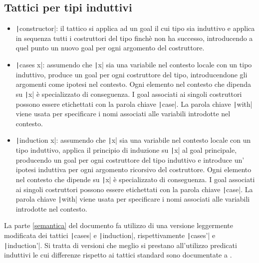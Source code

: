 \begin{itemize}
\end{itemize}

\subsection{Tattici per tipi induttivi}
\begin{itemize}
    \item \texttt|constructor|: il tattico si applica ad un goal il cui tipo sia induttivo e applica in sequenza tutti i costruttori del tipo finchè non ha successo, introducendo a quel punto un nuovo goal per ogni argomento del costruttore.
    \item \texttt|cases x|: assumendo che \texttt|x| sia una variabile nel contesto locale con un tipo induttivo, produce un goal per ogni costruttore del tipo, introducendone gli argomenti come ipotesi nel contesto. Ogni elemento nel contesto che dipenda su \texttt|x| è specializzato di conseguenza. I goal associati ai singoli costruttori possono essere etichettati con la parola chiave \texttt|case|. La parola chiave \texttt|with| viene usata per specificare i nomi associati alle variabili introdotte nel contesto.
    \item \texttt|induction x|: assumendo che \texttt|x| sia una variabile nel contesto locale con un tipo induttivo, applica il principio di induzione su \texttt|x| al goal principale, producendo un goal per ogni costruttore del tipo induttivo e introduce un' ipotesi induttiva per ogni argomento ricorsivo del costruttore. Ogni elemento nel contesto che dipende su \texttt|x| è specializzato di conseguenza. I goal associati ai singoli costruttori possono essere etichettati con la parola chiave \texttt|case|. La parola chiave \texttt|with| viene usata per specificare i nomi associati alle variabili introdotte nel contesto.
\end{itemize}
La parte \ref{semantica} del documento fa utilizzo di una versione leggermente modificata dei tattici \texttt|cases| e \texttt|induction|, rispettivamente \texttt|cases'| e \texttt|induction'|. Si tratta di versioni che meglio si prestano all'utilizzo predicati induttivi le cui differenze rispetto ai tattici standard sono documentate a \cite{matht}.

